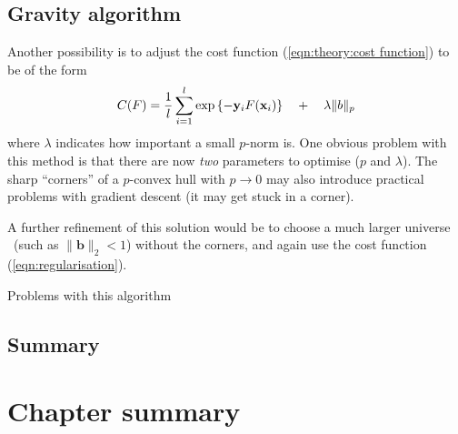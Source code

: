 \subsection{Gravity algorithm}

  Another possibility is to adjust the cost function
(\ref{eqn:theory:cost function}) to be of the form
%
\begin{equation}
C(F) = \frac{1}{l} \sum_{i=1}^{l} \exp
\left\{ -\mathbf{y}_iF(\mathbf{x}_i) \right\} \quad + \quad \lambda \|b\|_p
\label{eqn:regularisation}
\end{equation}
%
where $\lambda$ indicates how important a small $p$-norm is.  One
obvious problem with this method is that there are now \emph{two}
parameters to optimise ($p$ and $\lambda$).  The sharp ``corners'' of a
$p$-convex hull with $p \rightarrow 0$ may also introduce practical
problems with gradient descent (it may get stuck in a corner).

A further refinement of this solution would be to choose a much larger
universe \calX\ (such as $\|\mathbf{b}\|_2 < 1$) without the corners,
and again use the cost function (\ref{eqn:regularisation}).

Problems with this algorithm

\subsection{Summary}

\section{Chapter summary}



